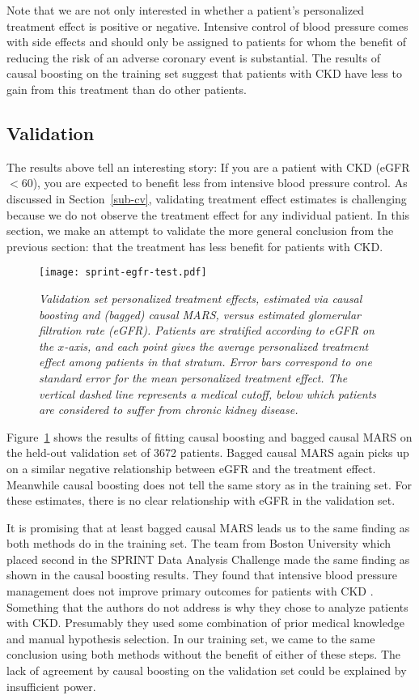 \documentclass{article}
\begin{document}
Note that we are not only interested in whether a patient's personalized
treatment effect is positive or negative. Intensive control of blood pressure
comes with side effects and should only be assigned to patients for whom the
benefit of reducing the risk of an adverse coronary event is substantial.
The results of causal boosting on the training set suggest that patients
with CKD have less to gain from this treatment than do other patients.


\subsection{Validation}

The results above tell an interesting story: If you are a patient with CKD
(eGFR $< 60$), you are expected to benefit less from intensive
blood pressure control.
As discussed in Section~\ref{sub-cv}, validating treatment effect estimates is
challenging because we do not observe the treatment effect for any individual
patient. In this section, we make an attempt to validate the more general
conclusion from the previous section: that the treatment has less benefit for
patients with CKD.

\begin{figure}
\caption{\it Validation set personalized treatment effects, estimated via
  causal boosting and (bagged) causal MARS, versus estimated glomerular
  filtration rate (eGFR). Patients are stratified according to eGFR on
  the $x$-axis, and each point gives the average personalized treatment effect
  among patients in that stratum. Error bars correspond to one standard error
  for the mean personalized treatment effect. The vertical dashed line
  represents a medical cutoff, below which patients are considered to suffer
  from chronic kidney disease.}
\label{fig-sprint-egfr-test}
\centering
\texttt{[image: sprint-egfr-test.pdf]}
\end{figure}

Figure~\ref{fig-sprint-egfr-test} shows the results of fitting causal boosting
and bagged causal MARS
on the held-out validation set of 3672 patients. Bagged causal MARS again picks
up on a similar negative relationship between eGFR and the treatment effect.
Meanwhile causal boosting does not tell the same story as in the training set.
For these estimates, there is no clear relationship with eGFR in the validation
set.

It is promising that at least bagged causal MARS leads us to the same finding
as both methods do in the training set. The team from Boston University which
placed second in the SPRINT Data Analysis Challenge made the same finding as
shown in the causal boosting results. They found that intensive blood pressure
management does not improve primary outcomes for patients with
CKD \citep{RenalityCheck}.
Something that the authors do not address is why they chose to analyze
patients with CKD. Presumably they used some combination of
prior medical knowledge and manual hypothesis selection. In our training set,
we came to the same conclusion using both methods without the benefit of
either of these steps. The lack of agreement by causal boosting on the
validation set could be explained by insufficient power.
\end{document}
